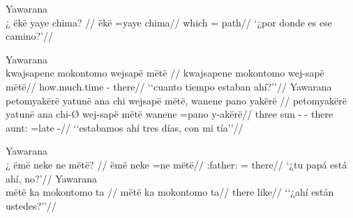 \documentclass{memoir}
\begin{document}
\ex Yawarana \\
\label{loc-main-q-locpred-nsubj}    \begingl
    \glpreamble ¿ ëkë yaye chima? //
    \gla ëkë =yaye chima//
    \glb which = path//
        \glft ‘¿por donde es ese camino?’//  
    \endgl 
\xe

\pex\label{loc-main-q-part-cop-nsubj}    \a Yawarana\\
    \label{convhistfamsjm-49}        \begingl
        \glpreamble kwajsapene mokontomo wejsapë mëtë //
        \gla kwajsapene mokontomo wej-sapë mëtë//
        \glb how.much.time  - there//
            \glft ‘‘cuanto tiempo estaban ahí?’’//  
        \endgl 
    \a Yawarana\\
    \label{convhistfamsjm-59}        \begingl
        \glpreamble petomyakërë yatunë ana chi wejsapë mëtë, wanene pano yakërë //
        \gla petomyakërë yatunë ana chi-Ø wej-sapë mëtë wanene =pano y-akërë//
        \glb three sun  - - there aunt: =late -//
            \glft ‘‘estabamos ahí tres días, con mi tía’’//  
        \endgl 
\xe

\pex\label{loc-main-q-part-nsubj}    \a Yawarana\\
    \label{convamgu-77}        \begingl
        \glpreamble ¿ ëmë neke ne mëtë? //
        \gla ëmë neke =ne mëtë//
        \glb {}:father:  = there//
            \glft ‘¿tu papá está ahí, no?’//  
        \endgl 
    \a Yawarana\\
    \label{ctowaru-66}        \begingl
        \glpreamble mëtë ka mokontomo ta //
        \gla mëtë ka mokontomo ta//
        \glb there   like//
            \glft ‘‘¿ahí están ustedes?’’//  
        \endgl 
\xe
\end{document}
